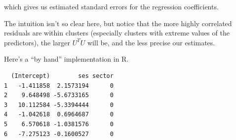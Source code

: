 \documentclass[
  letterpaper,
  DIV=11,
  numbers=noendperiod]{scrreprt}
\newenvironment{Shaded}{}{}
\newcommand{\DocumentationTok}[1]{\textcolor[rgb]{0.73,0.13,0.13}{\textit{#1}}}
\newcommand{\FunctionTok}[1]{\textcolor[rgb]{0.02,0.16,0.49}{#1}}
\newcommand{\NormalTok}[1]{#1}
\newcommand{\OtherTok}[1]{\textcolor[rgb]{0.00,0.44,0.13}{#1}}
\newcommand{\SpecialCharTok}[1]{\textcolor[rgb]{0.25,0.44,0.63}{#1}}
\begin{document}
which gives us estimated standard errors for the regression
coefficients.

The intuition isn't so clear here, but notice that the more highly
correlated residuals are within clusters (especially clusters with
extreme values of the predictors), the larger \(U^TU\) will be, and the
less precise our estimates.

Here's a ``by hand'' implementation in R.

\begin{Shaded}
\end{Shaded}

\begin{verbatim}
  (Intercept)        ses sector
1   -1.411858  2.1573194      0
2    9.648498 -5.6733165      0
3   10.112584 -5.3394444      0
4   -1.042618  0.6964687      0
5    6.570618 -1.0381576      0
6   -7.275123 -0.1600527      0
\end{verbatim}
\end{document}
